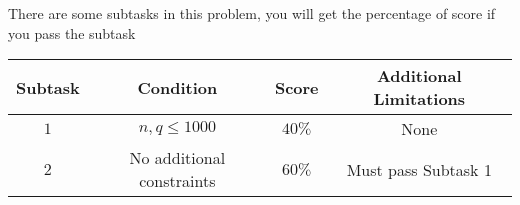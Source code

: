 There are some subtasks in this problem, you will get the percentage of score if you pass the subtask

\begin{center}
  \begin{tabular}{ | c | c | c | c | } \hline
    \bf{Subtask} &
    \bf{Condition} &
    \bf{Score} &
    \bf{Additional Limitations} \\ \hline
    $1$ & $n,q \le 1000$ & $40\%$ & None \\ \hline
    $2$ & No additional constraints & $60\%$ & Must pass Subtask 1 \\ \hline
    \end{tabular}
\end{center}